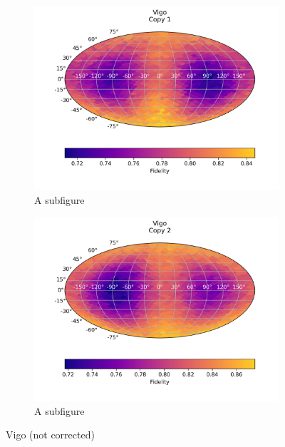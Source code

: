 \begin{figure}[H]
    \centering
    \begin{subfigure}{.5\textwidth}
      \centering
      \includegraphics[width=\textwidth]{Figures/PhaseCovariant/IBM/FullSphere/results_vigo.txt_copy1.png}
      \caption{A subfigure}
      \label{fig:pc_vigo_sphere_1}
    \end{subfigure}%
    \begin{subfigure}{.5\textwidth}
      \centering
      \includegraphics[width=\textwidth]{Figures/PhaseCovariant/IBM/FullSphere/results_vigo.txt_copy2.png}
      \caption{A subfigure}
      \label{fig:pc_vigo_sphere_2}
    \end{subfigure}
    \caption{Vigo (not corrected)}
    \label{fig:pc_vigo_sphere}
\end{figure}

